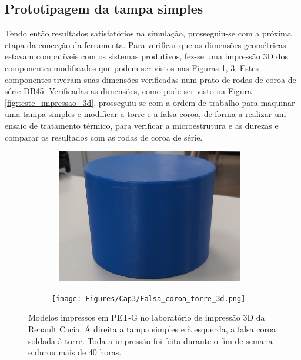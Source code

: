 \subsection{Prototipagem da tampa simples}  \label{ssec:materiais_prototipagem_simples}
Tendo então resultados satisfatórios na simulação, prosseguiu-se com a próxima etapa da conceção da ferramenta. Para verificar que as dimensões geométricas estavam compatíveis com os sistemas produtivos, fez-se uma impressão 3D dos componentes modificados que podem ser vistos nas Figuras \ref{fig:Tampa_simples_3d}, \ref{fig:falsa_coroa_torre_3d}. Estes componentes tiveram suas dimensões verificadas num prato de rodas de coroa de série DB45. Verificadas as dimensões, como pode ser visto na Figura \ref{fig:teste_impressao_3d}, prosseguiu-se com a ordem de trabalho para maquinar uma tampa simples e modificar a torre e a falsa coroa, de forma a realizar um ensaio de tratamento térmico, para verificar a microestrutura e as durezas e comparar os resultados com as rodas de coroa de série.
\begin{figure}[htb]
    \centering
    \begin{subfigure}{.5\textwidth}\
        \centering
        \includegraphics[width = 0.9\textwidth]{Figures/Cap3/tampa_simples_3d.png}
        \caption{}
        \label{fig:Tampa_simples_3d}
    \end{subfigure}%
    \begin{subfigure}{.5\textwidth}
        \centering
        \texttt{[image: Figures/Cap3/Falsa\_coroa\_torre\_3d.png]}
        \caption{}
        \label{fig:falsa_coroa_torre_3d}
    \end{subfigure}
    \caption[Modelos dos componentes modificados impressos em PET-G.]%
    {Modelos impressos em PET-G no laboratório de impressão 3D da Renault Cacia, Á direita a tampa simples e à esquerda, a falsa coroa soldada à torre. Toda a impressão foi feita durante o fim de semana e durou mais de 40 horas.}
\end{figure}

